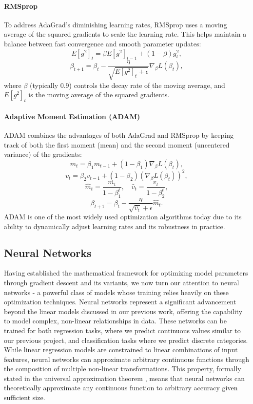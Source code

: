 \paragraph*{RMSprop}
To address AdaGrad's diminishing learning rates, RMSprop uses a moving average of the squared gradients to scale the learning rate. This helps maintain a balance between fast convergence and smooth parameter updates:
\[
    E[g^2]_t = \beta E[g^2]_{t-1} + (1 - \beta) g_t^2,
\]
\[
    \beta_{t+1} = \beta_t - \frac{\eta}{\sqrt{E[g^2]_t + \epsilon}} \nabla_\beta L(\beta_t),
\]
where \( \beta \) (typically 0.9) controls the decay rate of the moving average, and \( E[g^2]_t \) is the moving average of the squared gradients.

\paragraph*{Adaptive Moment Estimation (ADAM)}
ADAM combines the advantages of both AdaGrad and RMSprop by keeping track of both the first moment (mean) and the second moment (uncentered variance) of the gradients:
\[
    m_t = \beta_1 m_{t-1} + (1 - \beta_1) \nabla_\beta L(\beta_t),
\]
\[
    v_t = \beta_2 v_{t-1} + (1 - \beta_2) (\nabla_\beta L(\beta_t))^2,
\]
\[
    \hat{m}_t = \frac{m_t}{1 - \beta_1^t}, \quad \hat{v}_t = \frac{v_t}{1 - \beta_2^t},
\]
\[
    \beta_{t+1} = \beta_t - \frac{\eta}{\sqrt{\hat{v}_t} + \epsilon} \hat{m}_t.
\]
ADAM is one of the most widely used optimization algorithms today due to its ability to dynamically adjust learning rates and its robustness in practice.

\subsection{Neural Networks}

Having established the mathematical framework for optimizing model parameters through gradient descent and its variants, we now turn our attention to neural networks - a powerful class of models whose training relies heavily on these optimization techniques. Neural networks represent a significant advancement beyond the linear models discussed in our previous work, offering the capability to model complex, non-linear relationships in data. These networks can be trained for both regression tasks, where we predict continuous values similar to our previous project, and classification tasks where we predict discrete categories. While linear regression models are constrained to linear combinations of input features, neural networks can approximate arbitrary continuous functions through the composition of multiple non-linear transformations. This property, formally stated in the universal approximation theorem \cite{uniapproxtheorem}, means that neural networks can theoretically approximate any continuous function to arbitrary accuracy given sufficient size.

